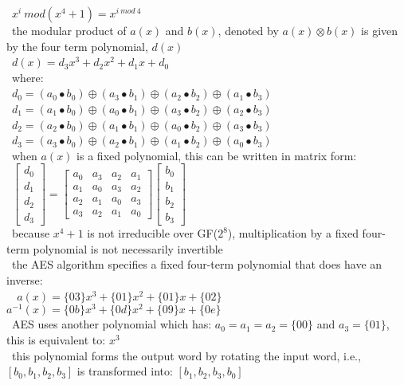 \documentclass[10pt,letterpaper]{scrartcl}
\newcommand{\tend}{\>\textendash}
\begin{document}
\begin{tabbing}
\>\>\>\>\ $x^i\ mod(x^4+1)=x^{i\ mod\ 4}$\\
\tend\ the modular product of $a(x)$ and $b(x)$, denoted by $a(x)\otimes b(x)$ is given by the four term polynomial, $d(x)$\\
\>\>\>\>\ $d(x)=d_3x^3+d_2x^2+d_1x+d_0$\\
\tend\ where: \\
\>\>\>\>\ $d_0 = (a_0\bullet b_0)\oplus (a_3\bullet b_1)\oplus (a_2\bullet b_2)\oplus (a_1\bullet b_3)$ \\
\>\>\>\>\ $d_1 = (a_1\bullet b_0)\oplus (a_0\bullet b_1)\oplus (a_3\bullet b_2)\oplus (a_2\bullet b_3)$ \\
\>\>\>\>\ $d_2 = (a_2\bullet b_0)\oplus (a_1\bullet b_1)\oplus (a_0\bullet b_2)\oplus (a_3\bullet b_3)$ \\
\>\>\>\>\ $d_3 = (a_3\bullet b_0)\oplus (a_2\bullet b_1)\oplus (a_1\bullet b_2)\oplus (a_0\bullet b_3)$ \\
\tend\ when $a(x)$ is a fixed polynomial, this can be written in matrix form: \\
\>\>\>\>\ $\begin{bmatrix} d_0 \\ d_1 \\ d_2 \\ d_3 \end{bmatrix}  = \begin{bmatrix} a_0 & a_3 & a_2 & a_1 \\ a_1 & a_0 & a_3 & a_2 \\ a_2 & a_1 & a_0 & a_3 \\ a_3 & a_2 & a_1 & a_0\end{bmatrix}\begin{bmatrix} b_0 \\ b_1 \\ b_2 \\ b_3 \end{bmatrix}$\\
\tend\ because $x^4 + 1$ is not irreducible over GF($2^8$), multiplication by a fixed four-term polynomial is not necessarily invertible \\
\tend\ the AES algorithm specifies a fixed four-term polynomial that does have an inverse: \\
\>\>\>\>\ $\ \ a(x)=\{03\}x^3+\{01\}x^2+\{01\}x+\{02\}$ \\
\>\>\>\> $a^{-1}(x)=\{0b\}x^3+\{0d\}x^2+\{09\}x+\{0e\}$ \\
\tend\ AES uses another polynomial which has: $a_0 = a_1 = a_2 = \{00\}$ and $a_3 = \{01\}$, this is equivalent to: $x^3$ \\ 
\tend\ this polynomial forms the output word by rotating the input word, i.e., $[b_0, b_1, b_2, b_3]$ is transformed into: $[b_1, b_2, b_3, b_0]$ \\
\end{tabbing}
\end{document}
